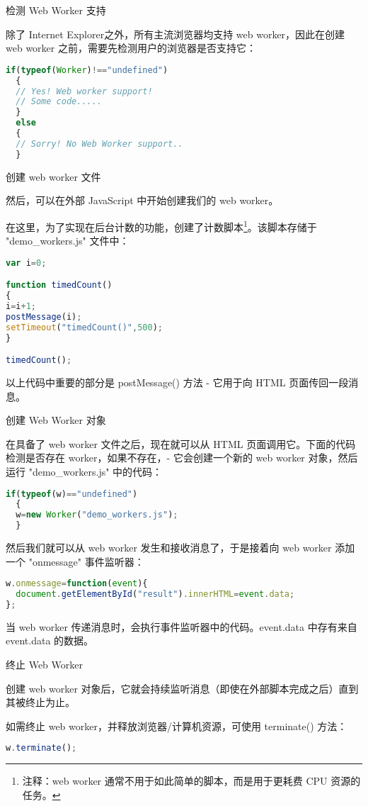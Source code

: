 \begin{compactenum}
\item 检测 Web Worker 支持



除了 Internet Explorer之外，所有主流浏览器均支持 web worker，因此在创建 web worker 之前，需要先检测用户的浏览器是否支持它：

\begin{lstlisting}[language=JavaScript]
  if(typeof(Worker)!=="undefined")
  {
  // Yes! Web worker support!
  // Some code.....
  }
  else
  {
  // Sorry! No Web Worker support..
  }
\end{lstlisting}

\item 创建 web worker 文件

然后，可以在外部 JavaScript 中开始创建我们的 web worker。

在这里，为了实现在后台计数的功能，创建了计数脚本\footnote{注释：web worker 通常不用于如此简单的脚本，而是用于更耗费 CPU 资源的任务。}。该脚本存储于 "demo\_workers.js" 文件中：

\begin{lstlisting}[language=JavaScript]
var i=0;

function timedCount()
{
i=i+1;
postMessage(i);
setTimeout("timedCount()",500);
}

timedCount();
\end{lstlisting}

以上代码中重要的部分是 postMessage() 方法 - 它用于向 HTML 页面传回一段消息。

\item 创建 Web Worker 对象

在具备了 web worker 文件之后，现在就可以从 HTML 页面调用它。下面的代码检测是否存在 worker，如果不存在，- 它会创建一个新的 web worker 对象，然后运行 "demo\_workers.js" 中的代码：

\begin{lstlisting}[language=JavaScript]
  if(typeof(w)=="undefined")
  {
  w=new Worker("demo_workers.js");
  }
\end{lstlisting}

然后我们就可以从 web worker 发生和接收消息了，于是接着向 web worker 添加一个 "onmessage" 事件监听器：

\begin{lstlisting}[language=JavaScript]
w.onmessage=function(event){
  document.getElementById("result").innerHTML=event.data;
};
\end{lstlisting}

当 web worker 传递消息时，会执行事件监听器中的代码。event.data 中存有来自 event.data 的数据。

\item 终止 Web Worker

创建 web worker 对象后，它就会持续监听消息（即使在外部脚本完成之后）直到其被终止为止。

如需终止 web worker，并释放浏览器/计算机资源，可使用 terminate() 方法：

\begin{lstlisting}[language=JavaScript]
w.terminate();
\end{lstlisting}


\end{compactenum}

